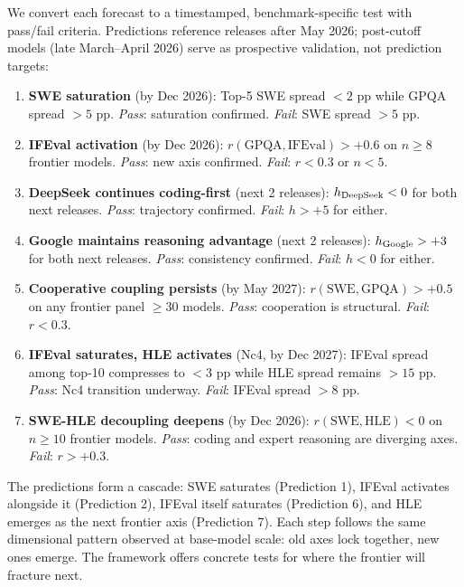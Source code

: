 \documentclass{article}
\begin{document}
We convert each forecast to a timestamped, benchmark-specific test
with pass/fail criteria.
Predictions reference releases after May 2026; post-cutoff models (late March--April 2026)
serve as prospective validation, not prediction targets:

\begin{enumerate}[nosep,leftmargin=*]
  \item \textbf{SWE saturation} (by Dec 2026):
        Top-5 SWE spread $< 2$ pp while GPQA spread $> 5$ pp.
        \textit{Pass}: saturation confirmed. \textit{Fail}: SWE spread $> 5$ pp.

  \item \textbf{IFEval activation} (by Dec 2026):
        $r(\text{GPQA}, \text{IFEval}) > +0.6$ on $n \geq 8$ frontier models.
        \textit{Pass}: new axis confirmed. \textit{Fail}: $r < 0.3$ or $n < 5$.

  \item \textbf{DeepSeek continues coding-first} (next 2 releases):
        $h_{\rm DeepSeek} < 0$ for both next releases.
        \textit{Pass}: trajectory confirmed. \textit{Fail}: $h > +5$ for either.

  \item \textbf{Google maintains reasoning advantage} (next 2 releases):
        $h_{\rm Google} > +3$ for both next releases.
        \textit{Pass}: consistency confirmed. \textit{Fail}: $h < 0$ for either.

  \item \textbf{Cooperative coupling persists} (by May 2027):
        $r(\text{SWE}, \text{GPQA}) > +0.5$ on any frontier panel $\geq 30$ models.
        \textit{Pass}: cooperation is structural. \textit{Fail}: $r < 0.3$.

  \item \textbf{IFEval saturates, HLE activates} (Nc4, by Dec 2027):
        IFEval spread among top-10 compresses to $< 3$ pp while HLE spread remains $> 15$ pp.
        \textit{Pass}: Nc4 transition underway. \textit{Fail}: IFEval spread $> 8$ pp.

  \item \textbf{SWE-HLE decoupling deepens} (by Dec 2026):
        $r(\text{SWE}, \text{HLE}) < 0$ on $n \geq 10$ frontier models.
        \textit{Pass}: coding and expert reasoning are diverging axes. \textit{Fail}: $r > +0.3$.
\end{enumerate}

The predictions form a cascade: SWE saturates (Prediction 1),
IFEval activates alongside it (Prediction 2),
IFEval itself saturates (Prediction 6),
and HLE emerges as the next frontier axis (Prediction 7).
Each step follows the same dimensional pattern observed at base-model scale:
old axes lock together, new ones emerge.
The framework offers concrete tests for where the frontier
will fracture next.
\end{document}
